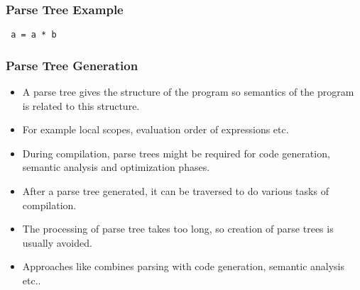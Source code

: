 \begin{frame}
\frametitle{Parse Tree Example}
\texttt{ a = a * b }\\
\centerline{
}
\end{frame}

\begin{frame}
\frametitle{Parse Tree Generation}
\begin{itemize}
\item A parse tree gives the structure of the program so semantics
	of the program is related to this structure.
\item For example local scopes, evaluation order of expressions etc.
\item During compilation, parse trees might be required for 
code generation, semantic analysis and optimization phases.
\item After a parse tree generated, it can be traversed to 
	do various tasks of compilation.
\item The processing of parse tree takes too long, so creation
	of parse trees is usually avoided. 
\item Approaches like  combines
	parsing with code generation, semantic analysis etc..
\end{itemize}
\end{frame}

